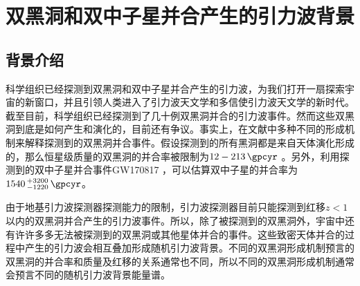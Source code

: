 \chapter{双黑洞和双中子星并合产生的引力波背景}\label{chap:SGWB}



\section{背景介绍}

\lvc 科学组织已经探测到双黑洞和双中子星并合产生的引力波\citep{TheLIGOScientific:2016pea,TheLIGOScientific:2016qqj,Abbott:2016nmj,Abbott:2016blz,    TheLIGOScientific:2017qsa,Abbott:2017vtc,Abbott:2017gyy,Abbott:2017oio}，为我们打开一扇探索宇宙的新窗口，并且引领人类进入了引力波天文学和多信使引力波天文学的新时代。截至目前，\lvc 科学组织已经探测到了几十例双黑洞并合的引力波事件。然而这些双黑洞到底是如何产生和演化的，目前还有争议。事实上，在文献中多种不同的形成机制来解释\lvc 探测到的双黑洞并合事件。假设\lvc 探测到的所有黑洞都是来自天体演化形成的，那么恒星级质量的双黑洞的并合率被限制为$12-213\, \gpcyr$ \citep{Abbott:2017vtc}。另外，利用探测到的双中子星并合事件GW170817 \citep{TheLIGOScientific:2017qsa}，可以估算双中子星的并合率为$1540\,^{+3200}_{-1220}\, \gpcyr$。

由于地基引力波探测器探测能力的限制，\lvc 引力波探测器目前只能探测到红移$z<1$以内的双黑洞并合产生的引力波事件\citep{TheLIGOScientific:2016htt,Aasi:2013wya}。所以，除了被\lvc 探测到的双黑洞外，宇宙中还有许许多多无法被\lvc 探测到的双黑洞或其他星体并合的事件。这些致密天体并合的过程中产生的引力波会相互叠加形成随机引力波背景\citep{Christensen:1992wi}。不同的双黑洞形成机制预言的双黑洞的并合率和质量及红移的关系通常也不同，所以不同的双黑洞形成机制通常会预言不同的随机引力波背景能量谱。

